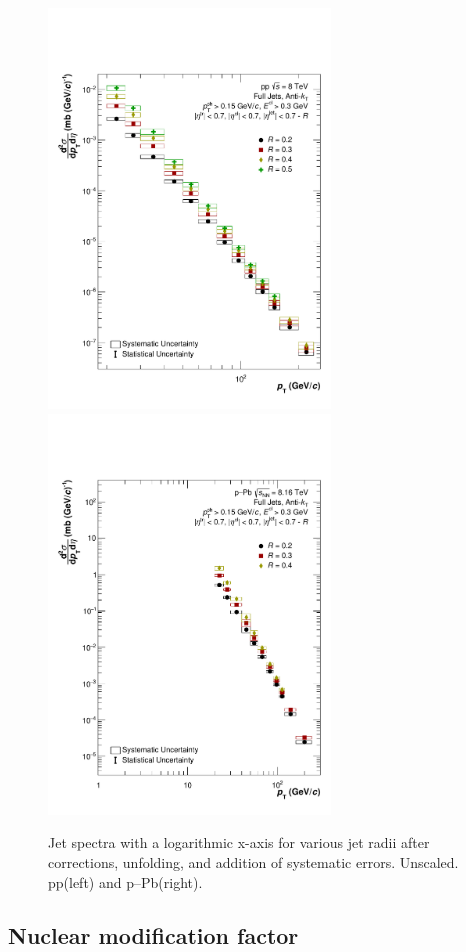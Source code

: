 \documentclass[ALICE]{ALICE_analysis_notes}
\newcommand{\pPb}{{\mbox{p--Pb}}\xspace}
\newcommand{\pp}{pp\xspace}
\begin{document}
\begin{figure}
    \centering
    \includegraphics[width=7.5cm]{figures/FinalResults/Bayes_reg6_logx_unscaled.pdf}
    \includegraphics[width=7.5cm]{figures/pPbFigures/FinalResults/Bayes_reg6_logx_unscaled.pdf}
    \caption{Jet spectra with a logarithmic x-axis for various jet radii after corrections, unfolding, and addition of systematic errors. Unscaled. \pp (left) and \pPb (right).}
    \label{fig:finalSpectraUnscaledLogX}
\end{figure}

\subsection{Nuclear modification factor}
\label{sec:resultsRpA}
\end{document}
